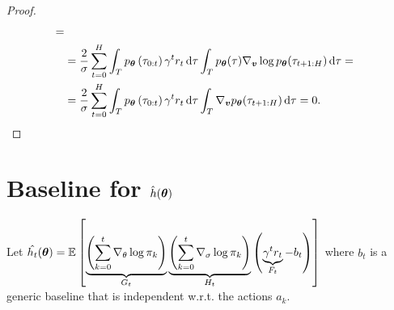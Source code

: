 \begin{proof}
\begin{align*}
= \\ &=
\frac{2}{\sigma}\sum_{t=0}^{H}\int_{T}p_{{\boldsymbol{\theta}}}\left(\tau_{0:t}\right)\gamma^{t}r_{t}\, \textrm{d}\tau\int_{T}p_{{\boldsymbol{\theta}}}(\tau)\nabla_{\boldsymbol{v}}\log p_{{\boldsymbol{\theta}}}(\tau_{t+1:H}) \, \textrm{d}\tau
= \\ &=
\frac{2}{\sigma}\sum_{t=0}^{H}\int_{T}p_{{\boldsymbol{\theta}}}\left(\tau_{0:t}\right)\gamma^{t}r_{t}\, \textrm{d}\tau\int_{T}\nabla_{\boldsymbol{v}} p_{{\boldsymbol{\theta}}}(\tau_{t+1:H}) \, \textrm{d}\tau
= 0.
\end{align*}
\normalsize
\allowdisplaybreaks[0]
\end{proof}

\section{Baseline for $\hat{h}({\boldsymbol{\theta}})$}

Let $\hat{h_{t}}({\boldsymbol{\theta}}) = {\mathbb{E}_{}\left[  \underbrace{\left(\sum_{k=0}^{t} \nabla_{\theta}\log\pi_{k} \right)}_{G_t} \underbrace{ \left(\sum_{k=0}^{t} \nabla_{\sigma}\log\pi_{k} \right) }_{H_t} \left( \underbrace{\gamma^{t}r_{t}}_{F_t} - b_t\right)  \right]}$ where $b_t$ is a generic baseline that is independent w.r.t. the actions $a_k$.

